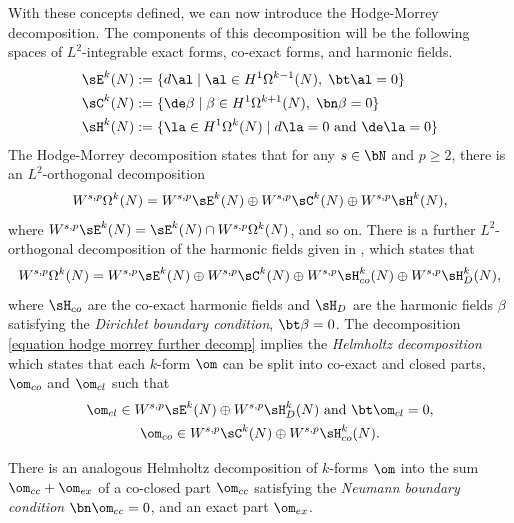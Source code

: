 \documentclass[hidelinks, 12pt, oneside, reqno]{amsart}
\begin{document}
With these concepts defined, we can now introduce the Hodge-Morrey decomposition. The components of this decomposition will be the following spaces of $L^2$-integrable exact forms, co-exact forms, and harmonic fields. 
\begin{align*}
    \sE^k(N) &:= \{d\al \;|\; \al \in H^1\Omega^{k-1}(N), \; \bt \al = 0\} \\
    \sC^k(N) &:= \{\de \beta \;|\; \beta \in H^1\Omega^{k+1}(N), \; \bn \beta = 0\} \\
    \sH^k(N) &:= \{\la \in H^1 \Omega^{k}(N) \; |\; d\la = 0 \textrm{ and } \de \la =0\}
\end{align*}
The Hodge-Morrey decomposition \cite[Theorem 2.4.2]{HodgeDecompSchwarz} states that for any $s \in \bN$ and $p \ge 2$, there is an $L^2$-orthogonal decomposition 
\begin{align}\label{equation hodge morrey decomp}
    W^{s,p}\Omega^k (N) = W^{s,p}\sE^k(N) \oplus W^{s,p}\sC^k(N) \oplus W^{s,p}\sH^k(N), 
\end{align}
where $W^{s,p}\sE^k(N) = \sE^k(N) \cap W^{s,p}\Omega^k (N)$, and so on. There is a further $L^2$-orthogonal decomposition of the harmonic fields given in \cite[Corollary 2.4.9]{HodgeDecompSchwarz}, which states that
\begin{align}\label{equation hodge morrey further decomp}
    W^{s,p}\Omega^k (N) = W^{s,p}\sE^k(N) \oplus W^{s,p}\sC^k(N) \oplus W^{s,p}\sH_{co}^k(N) \oplus W^{s,p}\sH_{D}^k(N), 
\end{align}
where $\sH_{co}$ are the co-exact harmonic fields and $\sH_{D}$ are the harmonic fields $\beta$ satisfying the \textit{Dirichlet boundary condition}, $\bt \beta = 0$. The decomposition \eqref{equation hodge morrey further decomp} implies the \textit{Helmholtz decomposition} which states that each $k$-form $\om$ can be split into co-exact and closed parts, $\om_{co}$ and $\om_{cl}$ such that
\begin{multline}\label{equation helmholtz decomp}
\om_{cl} \in W^{s,p}\sE^k(N) \oplus W^{s,p}\sH_{D}^k(N) \text{ and }\bt \om_{cl} = 0,\\ \om_{co} \in W^{s,p}\sC^k(N) \oplus W^{s,p}\sH_{co}^k(N).
\end{multline}

\begin{rmk}\label{remark mirror helmholtz decomp}
    There is an analogous Helmholtz decomposition of $k$-forms $\om$ into the sum $\om_{cc} + \om_{ex}$ of a co-closed part $\om_{cc}$ satisfying the \textit{Neumann boundary condition} $\bn \om_{cc} = 0$, and an exact part $\om_{ex}$.
\end{rmk}
\end{document}

